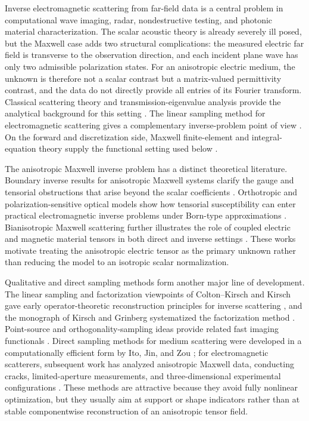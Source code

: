 \documentclass[11pt]{article}
\numberwithin{equation}{section}
\theoremstyle{plain}
\theoremstyle{definition}
\begin{document}
Inverse electromagnetic scattering from far-field data is a central problem in computational wave imaging, radar, nondestructive testing, and photonic material characterization.  The scalar acoustic theory is already severely ill posed, but the Maxwell case adds two structural complications: the measured electric far field is transverse to the observation direction, and each incident plane wave has only two admissible polarization states.  For an anisotropic electric medium, the unknown is therefore not a scalar contrast but a matrix-valued permittivity contrast, and the data do not directly provide all entries of its Fourier transform.  Classical scattering theory and transmission-eigenvalue analysis provide the analytical background for this setting \cite{ColtonKress2019,CakoniColtonHaddar2016}.  The linear sampling method for electromagnetic scattering gives a complementary inverse-problem point of view \cite{CakoniColtonMonk2011}.  On the forward and discretization side, Maxwell finite-element and integral-equation theory supply the functional setting used below \cite{Monk2003,Nedelec2001,Hiptmair2002}.

The anisotropic Maxwell inverse problem has a distinct theoretical literature.  Boundary inverse results for anisotropic Maxwell systems clarify the gauge and tensorial obstructions that arise beyond the scalar coefficients \cite{KenigSaloUhlmann2011}.  Orthotropic and polarization-sensitive optical models show how tensorial susceptibility can enter practical electromagnetic inverse problems under Born-type approximations \cite{ElbauMindrinosScherzer2018}.  Bianisotropic Maxwell scattering further illustrates the role of coupled electric and magnetic material tensors in both direct and inverse settings \cite{Nguyen2019}.  These works motivate treating the anisotropic electric tensor as the primary unknown rather than reducing the model to an isotropic scalar normalization.

Qualitative and direct sampling methods form another major line of development.  The linear sampling and factorization viewpoints of Colton--Kirsch and Kirsch gave early operator-theoretic reconstruction principles for inverse scattering \cite{ColtonKirsch1996,Kirsch1998}, and the monograph of Kirsch and Grinberg systematized the factorization method \cite{KirschGrinberg2008}.  Point-source and orthogonality-sampling ideas provide related fast imaging functionals \cite{Potthast1996,Potthast2010}.  Direct sampling methods for medium scattering were developed in a computationally efficient form by Ito, Jin, and Zou \cite{ItoJinZou2012}; for electromagnetic scatterers, subsequent work has analyzed anisotropic Maxwell data, conducting cracks, limited-aperture measurements, and three-dimensional experimental configurations \cite{HarrisNguyen2020,Park2018,AhnChaePark2020,LeNguyenSchmidtTruong2022}.  These methods are attractive because they avoid fully nonlinear optimization, but they usually aim at support or shape indicators rather than at stable componentwise reconstruction of an anisotropic tensor field.
\end{document}

